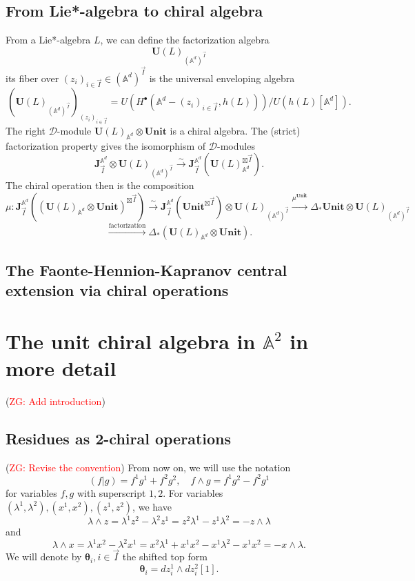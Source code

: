 \documentclass[11pt]{amsart}
\theoremstyle{definition}
\theoremstyle{remark}
\numberwithin{equation}{section}
\newcommand{\Gui}[1]{(\textcolor{red}{ZG: #1})}
\begin{document}
\subsection{From Lie*-algebra to chiral algebra}
From a Lie*-algebra $L$, we can define the factorization algebra
$$
\mathbf{U}(L)_{(\mathbb{A}^d)^{\vec{I}}}
$$
its fiber over $(z_i)_{i\in\vec{I}}\in (\mathbb{A}^d)^{\vec{I}}$ is the universal enveloping algebra
$$
\left(\mathbf{U}(L)_{(\mathbb{A}^d)^{\vec{I}}}\right)_{(z_i)_{i\in\vec{I}}}=U\left(H^{\bullet}(\mathbb{A}^d-(z_i)_{i\in\vec{I}},h(L))\right)/U\left(h(L)[\mathbb{A}^d]\right).
$$
The right $\mathcal{D}$-module $\mathbf{U}(L)_{\mathbb{A}^d}\otimes \mathbf{Unit}$ is a chiral algebra. The (strict) factorization property gives the isomorphism of $\mathcal{D}$-modules
$$ \mathbf{J}^{\mathbb{A}^d}_{\vec{I}}\otimes \mathbf{U}(L)_{(\mathbb{A}^d)^{\vec{I}}}\xrightarrow{\sim}\mathbf{J}^{\mathbb{A}^d}_{\vec{I}}\left(\mathbf{U}(L)_{\mathbb{A}^d}^{\boxtimes\vec{I}}\right).
$$
The chiral operation then is the composition
$$
\mu:\mathbf{J}^{\mathbb{A}^d}_{\vec{I}}\left((\mathbf{U}(L)_{\mathbb{A}^d}\otimes \mathbf{Unit})^{\boxtimes\vec{I}}\right)\xrightarrow{\sim} \mathbf{J}^{\mathbb{A}^d}_{\vec{I}}(\mathbf{Unit}^{\boxtimes\vec{I}})\otimes \mathbf{U}(L)_{(\mathbb{A}^d)^{\vec{I}}}\xrightarrow{\mu^{\mathbf{Unit}}}\Delta_*\mathbf{Unit}\otimes \mathbf{U}(L)_{(\mathbb{A}^d)^{\vec{I}}}
$$
$$
\xrightarrow{\text{factorization}}\Delta_*\left(\mathbf{U}(L)_{\mathbb{A}^d}\otimes \mathbf{Unit}\right).
$$
\subsection{The Faonte-Hennion-Kapranov central extension via chiral operations}


\section{The unit chiral algebra in $\mathbb{A}^2$ in more detail}
\Gui{Add introduction}
\subsection{Residues as 2-chiral operations}
\Gui{Revise the convention}
From now on, we will use the notation
$$
(f|g)=f^1g^1+f^2g^2,\quad f\wedge g=f^1g^2-f^2g^1
$$
for variables $f,g$ with superscript $1,2$. For variables $(\lambda^1,\lambda^2), (x^1,x^2), (z^1,z^2)$, we have
$$
\lambda\wedge z=\lambda^1z^2-\lambda^2z^1=z^2\lambda^1-z^1\lambda^2=-z\wedge\lambda
$$
and
$$
\lambda\wedge x=\lambda^1x^2-\lambda^2x^1=x^2\lambda^1+x^1x^2-x^1\lambda^2-x^1x^2=-x\wedge\lambda.
$$
We will denote by $\boldsymbol{\theta}_i,i\in \vec{I}$ the shifted top form
$$
\boldsymbol{\theta}_i=dz_i^1\wedge dz^2_i[1].
$$
\end{document}
